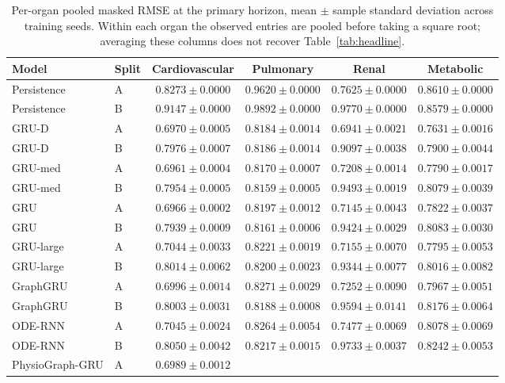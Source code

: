 \begin{table}[tbp]
\centering
\caption{Per-organ pooled masked RMSE at the primary horizon, mean $\pm$ sample standard deviation across training seeds. Within each organ the observed entries are pooled before taking a square root; averaging these columns does not recover Table~\ref{tab:headline}.}\label{tab:perorgan}
\small\setlength{\tabcolsep}{4pt}
\begin{tabular}{llcccc}
\toprule
Model 
& Split 
& Cardiovascular 
& Pulmonary 
& Renal 
& Metabolic 
\\
\midrule
Persistence 
& A 
& $0.8273\pm0.0000$ 
& $0.9620\pm0.0000$ 
& $0.7625\pm0.0000$ 
& $0.8610\pm0.0000$ 
\\
Persistence 
& B 
& $0.9147\pm0.0000$ 
& $0.9892\pm0.0000$ 
& $0.9770\pm0.0000$ 
& $0.8579\pm0.0000$ 
\\
GRU-D 
& A 
& $0.6970\pm0.0005$ 
& $0.8184\pm0.0014$ 
& $0.6941\pm0.0021$ 
& $0.7631\pm0.0016$ 
\\
GRU-D 
& B 
& $0.7976\pm0.0007$ 
& $0.8186\pm0.0014$ 
& $0.9097\pm0.0038$ 
& $0.7900\pm0.0044$ 
\\
GRU-med 
& A 
& $0.6961\pm0.0004$ 
& $0.8170\pm0.0007$ 
& $0.7208\pm0.0014$ 
& $0.7790\pm0.0017$ 
\\
GRU-med 
& B 
& $0.7954\pm0.0005$ 
& $0.8159\pm0.0005$ 
& $0.9493\pm0.0019$ 
& $0.8079\pm0.0039$ 
\\
GRU 
& A 
& $0.6966\pm0.0002$ 
& $0.8197\pm0.0012$ 
& $0.7145\pm0.0043$ 
& $0.7822\pm0.0037$ 
\\
GRU 
& B 
& $0.7939\pm0.0009$ 
& $0.8161\pm0.0006$ 
& $0.9424\pm0.0029$ 
& $0.8083\pm0.0030$ 
\\
GRU-large 
& A 
& $0.7044\pm0.0033$ 
& $0.8221\pm0.0019$ 
& $0.7155\pm0.0070$ 
& $0.7795\pm0.0053$ 
\\
GRU-large 
& B 
& $0.8014\pm0.0062$ 
& $0.8200\pm0.0023$ 
& $0.9344\pm0.0077$ 
& $0.8016\pm0.0082$ 
\\
GraphGRU 
& A 
& $0.6996\pm0.0014$ 
& $0.8271\pm0.0029$ 
& $0.7252\pm0.0090$ 
& $0.7967\pm0.0051$ 
\\
GraphGRU 
& B 
& $0.8003\pm0.0031$ 
& $0.8188\pm0.0008$ 
& $0.9594\pm0.0141$ 
& $0.8176\pm0.0064$ 
\\
ODE-RNN 
& A 
& $0.7045\pm0.0024$ 
& $0.8264\pm0.0054$ 
& $0.7477\pm0.0069$ 
& $0.8078\pm0.0069$ 
\\
ODE-RNN 
& B 
& $0.8050\pm0.0042$ 
& $0.8217\pm0.0015$ 
& $0.9733\pm0.0037$ 
& $0.8242\pm0.0053$ 
\\
PhysioGraph-GRU 
& A 
& $0.6989\pm0.0012$ 

\end{tabular}
\end{table}
